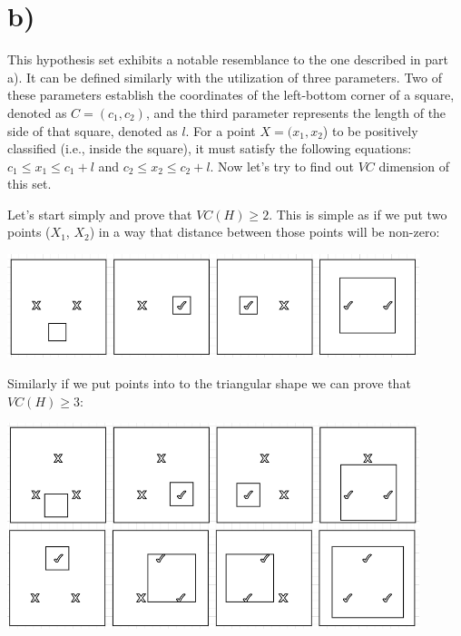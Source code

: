\documentclass[a4paper]{article}
\begin{document}
	\section{b)}
	
	This hypothesis set exhibits a notable resemblance to the one described in part a). It can be defined similarly with the utilization of three parameters. Two of these parameters establish the coordinates of the left-bottom corner of a square, denoted as $C=(c_1, c_2)$, and the third parameter represents the length of the side of that square, denoted as $l$. For a point $X=(x_1,x_2$) to be positively classified (i.e., inside the square), it must satisfy the following equations: $c_1 \leq x_1 \leq c_1+l$ and $c_2 \leq x_2 \leq c_2+l$. Now let's try to find out $VC$ dimension of this set.
	
	Let's start simply and prove that $VC(H) \geq 2$.
	This is simple as if we put two points ($X_1$, $X_2$) in a way that distance between those points will be non-zero:
	
	\centerline{\includegraphics[width=0.9\textwidth]{square_2}} 
	
	Similarly if we put points into to the triangular shape we can prove that $VC(H) \geq 3$:
	
	\centerline{\includegraphics[width=0.9\textwidth]{square_3}} 
	
\end{document}
